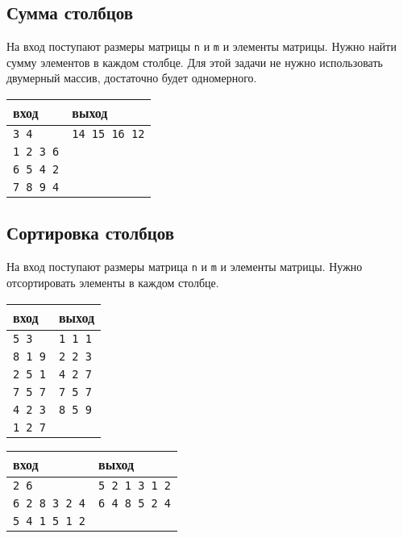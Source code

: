 \documentclass{article}
\begin{document}
\subsection{Сумма столбцов}
На вход поступают размеры матрицы \texttt{n} и \texttt{m} и элементы матрицы. Нужно найти сумму элементов в каждом столбце. Для этой задачи не нужно использовать двумерный массив, достаточно будет одномерного.
\begin{center}
\begin{tabular}{ l | l }
 вход & выход \\ \hline
 \texttt{3 4} &    \texttt{14 15 16 12}  \\ 
 \texttt{1 2 3 6} &  \\
 \texttt{6 5 4 2} &  \\ 
 \texttt{7 8 9 4} &  \\ 
\end{tabular}
\end{center}



\subsection{Сортировка столбцов}
На вход поступают размеры матрица \texttt{n} и \texttt{m} и элементы матрицы. Нужно отсортировать элементы в каждом столбце.
\begin{multicols}{2}
\begin{center}
\begin{tabular}{ l | l }
 вход & выход \\ \hline
 \texttt{5 3} &    \texttt{1 1 1} \\ 
 \texttt{8 1 9} &  \texttt{2 2 3}\\
 \texttt{2 5 1} &  \texttt{4 2 7}\\ 
 \texttt{7 5 7} &  \texttt{7 5 7}\\ 
 \texttt{4 2 3} &  \texttt{8 5 9}\\ 
 \texttt{1 2 7} &  \\ 
\end{tabular}
\end{center}

\begin{center}
\begin{tabular}{ l | l }
 вход & выход \\ \hline
 \texttt{2 6} &          \texttt{5 2 1 3 1 2} \\ 
 \texttt{6 2 8 3 2 4} &  \texttt{6 4 8 5 2 4}\\
 \texttt{5 4 1 5 1 2} & \\ 
\end{tabular}
\end{center}
\end{multicols}
\end{document}
